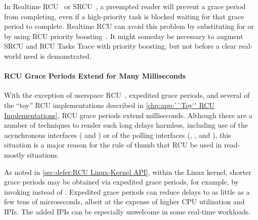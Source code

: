 In Realtime RCU~\cite{DinakarGuniguntala2008IBMSysJ} or
SRCU~\cite{PaulEMcKenney2006c},
a preempted reader will prevent a grace period from completing, even if
a high-priority task is blocked waiting for that grace period to complete.
Realtime RCU can avoid this problem by substituting 
for  or by using RCU priority
boosting~\cite{PaulEMcKenney2007BoostRCU,DinakarGuniguntala2008IBMSysJ}.
It might someday be necessary to augment SRCU and RCU Tasks Trace with
priority boosting, but not before a clear real-world need is demonstrated.

\QuickQuizEnd

\paragraph{RCU Grace Periods Extend for Many Milliseconds}

With the exception of userspace
RCU~\cite{MathieuDesnoyers2009URCU,PaulMcKenney2013LWNURCU},
expedited grace periods, and several of the ``toy''
RCU implementations described in
\cref{chp:app:``Toy'' RCU Implementations},
RCU grace periods extend milliseconds.
Although there are a number of techniques to render such long
delays harmless, including use of the asynchronous interfaces
( and ) or of the polling interfaces
(, ,
and ), this situation is a major reason
for the rule of thumb that RCU be used in read-mostly situations.

As noted in \cref{sec:defer:RCU Linux-Kernel API}, within the Linux
kernel, shorter grace periods may be obtained via expedited grace
periods, for example, by invoking 
instead of .
Expedited grace periods can reduce delays to as little as a few tens of
microseconds, albeit at the expense of higher CPU utilization and IPIs.
The added IPIs can be especially unwelcome in some real-time workloads.

